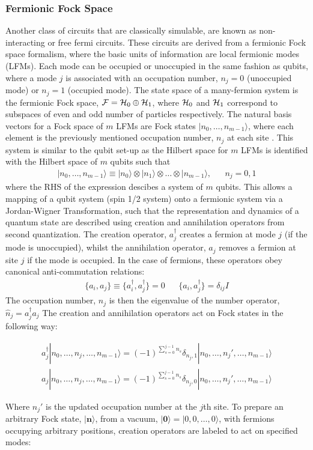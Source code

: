 \subsubsection{Fermionic Fock Space}
Another class of circuits that are classically simulable, are known as non-interacting or free fermi circuits.
These circuits are derived from a fermionic Fock space formalism, where the basic units of information are local
fermionic modes (LFMs). Each mode can be occupied or unoccupied in the same fashion as qubits, where
a mode $j$ is associated with an occupation number, $n_j = 0$ (unoccupied mode) or $n_j = 1$ (occupied mode).
The state space of a many-fermion system is the fermionic Fock space, ${\cal F} = {\cal H}_0 \oplus {\cal H}_1$,
where ${\cal H}_0$ and ${\cal H}_1$ correspond to subspaces of even and odd number of particles respectively.
The natural basis vectors for a Fock space of $m$ LFMs are Fock states $|n_0, \dots, n_{m-1}\rangle$,
where each element is the previously mentioned occupation number, $n_j$ at each site \cite{DeFelice2019}.
This system is similar to the qubit set-up as the Hilbert space for $m$ LFMs is identified with the Hilbert space
of $m$ qubits such that
\begin{align*}
    |n_0, \dots, n_{m-1}\rangle \equiv | n_0 \rangle \otimes | n_1 \rangle \otimes \dots \otimes | n_{m-1} \rangle, &  & n_j = 0,1
\end{align*}
where the RHS of the expression descibes a system of $m$ qubits. This allows a mapping of a qubit system (spin 1/2 system) onto
a fermionic system via a Jordan-Wigner Transformation, such that the representation and dynamics of a quantum
state are described using creation and annihilation operators from second quantization.
The creation operator, $a_j^{\dagger}$ creates a fermion at mode $j$ (if the mode is unoccupied),
whilst the annihilation operator, $a_j$ removes a fermion at site $j$ if the mode is occupied.
In the case of fermions, these operators obey canonical anti-commutation relations:
\begin{align}
    \{a_i, a_j\} \equiv \{a_i^{\dagger}, a_j^{\dagger}\} = 0 &  & \{a_i, a_j^{\dagger}\} = \delta_{ij}I
\end{align}
The occupation number, $n_j$ is then the eigenvalue of the number operator, $\hat{n}_j = a^{\dagger}_j a_j$
The creation and annihilation operators act on Fock states in the following way:
\begin{widetext}
    \begin{align*}
        a_j^{\dagger} |n_0, \dots, n_j, \dots, n_{m-1}\rangle = (-1)^{\sum^{j-1}_{s=0}n_s}\delta_{n_j, 1}  |n_0, \dots, n_j', \dots, n_{m-1}\rangle \\
        a_j |n_0, \dots, n_j, \dots, n_{m-1}\rangle = (-1)^{\sum^{j-1}_{s=0}n_s}\delta_{n_j, 0}  |n_0, \dots, n_j', \dots, n_{m-1}\rangle
    \end{align*}
\end{widetext}
Where $n_j'$ is the updated occupation number at the $j$th site.
To prepare an arbitrary Fock state, $|{\mathbf n}\rangle$, from a vacuum, $|{\mathbf 0}\rangle = |0,0,\dots,0\rangle$,
with fermions occupying arbitrary positions, creation operators are labeled to act on specified modes:

